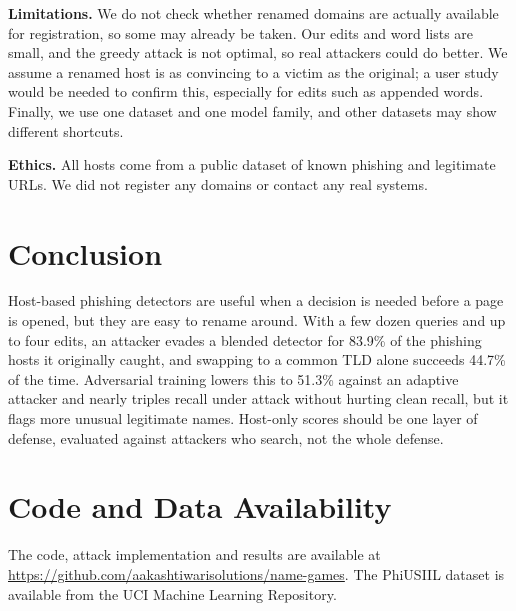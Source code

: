 \documentclass[conference]{IEEEtran}
\begin{document}
\textbf{Limitations.} We do not check whether renamed domains are actually available for registration, so some may already be taken. Our edits and word lists are small, and the greedy attack is not optimal, so real attackers could do better. We assume a renamed host is as convincing to a victim as the original; a user study would be needed to confirm this, especially for edits such as appended words. Finally, we use one dataset and one model family, and other datasets may show different shortcuts.

\textbf{Ethics.} All hosts come from a public dataset of known phishing and legitimate URLs. We did not register any domains or contact any real systems.

\section{Conclusion}

Host-based phishing detectors are useful when a decision is needed before a page is opened, but they are easy to rename around. With a few dozen queries and up to four edits, an attacker evades a blended detector for 83.9\% of the phishing hosts it originally caught, and swapping to a common TLD alone succeeds 44.7\% of the time. Adversarial training lowers this to 51.3\% against an adaptive attacker and nearly triples recall under attack without hurting clean recall, but it flags more unusual legitimate names. Host-only scores should be one layer of defense, evaluated against attackers who search, not the whole defense.

\section*{Code and Data Availability}
The code, attack implementation and results are available at \url{https://github.com/aakashtiwarisolutions/name-games}. The PhiUSIIL dataset is available from the UCI Machine Learning Repository.
\end{document}
